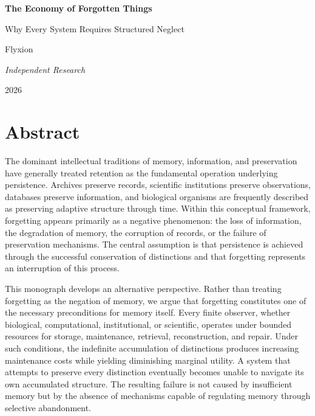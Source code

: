\documentclass[12pt,oneside]{book}
\theoremstyle{plain} \newtheorem{theorem}{Theorem}[chapter] \newtheorem{lemma}[theorem]{Lemma} \newtheorem{proposition}[theorem]{Proposition} \newtheorem{corollary}[theorem]{Corollary}
\theoremstyle{definition} \newtheorem{definition}[theorem]{Definition} \newtheorem{axiom}[theorem]{Axiom} \newtheorem{construction}[theorem]{Construction}
\theoremstyle{remark} \newtheorem{remark}[theorem]{Remark} \newtheorem{example}[theorem]{Example}
\begin{document}
\frontmatter

\begin{titlepage}

\centering

\vspace*{0.20\textheight}

{\Huge\bfseries
The Economy of Forgotten Things\par}

\vspace{1em}

{\Large
Why Every System Requires Structured Neglect\par}

\vspace{3em}

{\Large
Flyxion\par}

\vspace{0.5em}

{\large
\textit{Independent Research}\par}

\vfill

2026

\end{titlepage}

\mainmatter

\chapter*{Abstract}

The dominant intellectual traditions of memory, information, and preservation have generally treated retention as the fundamental operation underlying persistence. Archives preserve records, scientific institutions preserve observations, databases preserve information, and biological organisms are frequently described as preserving adaptive structure through time. Within this conceptual framework, forgetting appears primarily as a negative phenomenon: the loss of information, the degradation of memory, the corruption of records, or the failure of preservation mechanisms. The central assumption is that persistence is achieved through the successful conservation of distinctions and that forgetting represents an interruption of this process.

This monograph develops an alternative perspective. Rather than treating forgetting as the negation of memory, we argue that forgetting constitutes one of the necessary preconditions for memory itself. Every finite observer, whether biological, computational, institutional, or scientific, operates under bounded resources for storage, maintenance, retrieval, reconstruction, and repair. Under such conditions, the indefinite accumulation of distinctions produces increasing maintenance costs while yielding diminishing marginal utility. A system that attempts to preserve every distinction eventually becomes unable to navigate its own accumulated structure. The resulting failure is not caused by insufficient memory but by the absence of mechanisms capable of regulating memory through selective abandonment.
\end{document}
